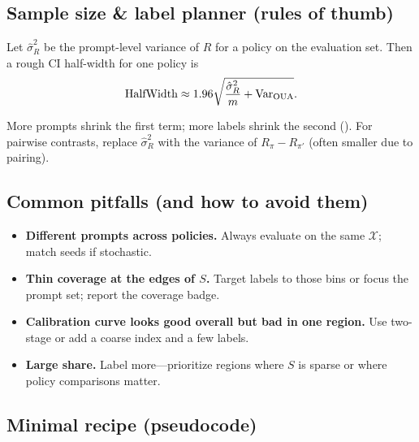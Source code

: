 \subsection{Sample size \& label planner (rules of thumb)}

Let $\hat{\sigma}_R^2$ be the prompt-level variance of $R$ for a policy on the evaluation set. Then a rough CI half-width for one policy is
\begin{equation}
\text{HalfWidth} \approx 1.96 \sqrt{\frac{\hat{\sigma}_R^2}{m} + \operatorname{Var}_{\text{OUA}}}.
\end{equation}

More prompts shrink the first term; more labels shrink the second (\oua). For pairwise contrasts, replace $\hat{\sigma}_R^2$ with the variance of $R_\pi - R_{\pi'}$ (often smaller due to pairing).

\subsection{Common pitfalls (and how to avoid them)}

\begin{itemize}
\item \textbf{Different prompts across policies.} Always evaluate on the same $\mathcal{X}$; match seeds if stochastic.

\item \textbf{Thin coverage at the edges of $S$.} Target labels to those bins or focus the prompt set; report the coverage badge.

\item \textbf{Calibration curve looks good overall but bad in one region.} Use two-stage \autocal{} or add a coarse index and a few labels.

\item \textbf{Large \oua{} share.} Label more---prioritize regions where $S$ is sparse or where policy comparisons matter.
\end{itemize}

\subsection{Minimal recipe (pseudocode)}

